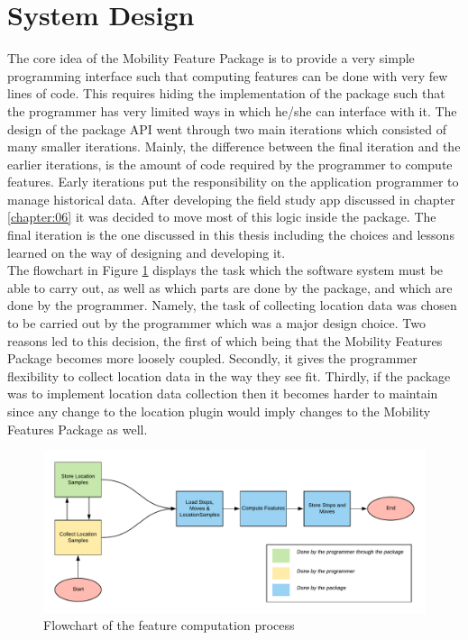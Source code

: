 \section{System Design}
The core idea of the Mobility Feature Package is to provide a very simple programming interface such that computing features can be done with very few lines of code. This requires hiding the implementation of the package such that the programmer has very limited ways in which he/she can interface with it. The design of the package API went through two main iterations which consisted of many smaller iterations. Mainly, the difference between the final iteration and the earlier iterations, is the amount of code required by the programmer to compute features. Early iterations put the responsibility on the application programmer to manage historical data. After developing the field study app discussed in chapter \ref{chapter:06} it was decided to move most of this logic inside the package. The final iteration is the one discussed in this thesis including the choices and lessons learned on the way of designing and developing it.\\

The flowchart in Figure \ref{fig:flowchart-features} displays the task which the software system must be able to carry out, as well as which parts are done by the package, and which are done by the programmer. Namely, the task of collecting location data was chosen to be carried out by the programmer which was a major design choice. Two reasons led to this decision, the first of which being that the Mobility Features Package becomes more loosely coupled. Secondly, it gives the programmer flexibility to collect location data in the way they see fit. Thirdly, if the package was to implement location data collection then it becomes harder to maintain since any change to the location plugin would imply changes to the Mobility Features Package as well. 

\begin{figure}[h]
    \centering
    \includegraphics[width=\textwidth]{images/diagrams/flowchart.pdf}
    \caption{Flowchart of the feature computation process}
    \label{fig:flowchart-features}
\end{figure}



